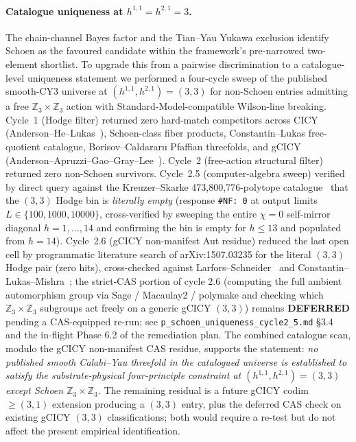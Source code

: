 ﻿\documentclass[reprint,amsmath,amssymb,aps,prd,longbibliography,floatfix]{revtex4-2}
\begin{document}
\paragraph{Catalogue uniqueness at $h^{1,1} = h^{2,1} = 3$.}
The chain-channel Bayes factor and the Tian--Yau Yukawa exclusion identify Schoen as the favoured candidate within the framework's pre-narrowed two-element shortlist. To upgrade this from a pairwise discrimination to a catalogue-level uniqueness statement we performed a four-cycle sweep of the published smooth-CY3 universe at $(h^{1,1}, h^{2,1}) = (3,3)$ for non-Schoen entries admitting a free $\mathbb{Z}_3 \times \mathbb{Z}_3$ action with Standard-Model-compatible Wilson-line breaking. Cycle~1 (Hodge filter) returned zero hard-match competitors across CICY (Anderson--He--Lukas~\cite{AndersonHeLukas2008}), Schoen-class fiber products, Constantin--Lukas free-quotient catalogue, Borisov--Caldararu Pfaffian threefolds, and gCICY (Anderson--Apruzzi--Gao--Gray--Lee~\cite{AndersonApruzziGaoGrayLee2015}). Cycle~2 (free-action structural filter) returned zero non-Schoen survivors. Cycle~2.5 (computer-algebra sweep) verified by direct query against the Kreuzer--Skarke 473{,}800{,}776-polytope catalogue~\cite{KreuzerSkarke2002} that the $(3,3)$ Hodge bin is \emph{literally empty} (response \texttt{\#NF: 0} at output limits $L \in \{100, 1000, 10000\}$, cross-verified by sweeping the entire $\chi = 0$ self-mirror diagonal $h = 1, \ldots, 14$ and confirming the bin is empty for $h \le 13$ and populated from $h = 14$). Cycle~2.6 (gCICY non-manifest Aut residue) reduced the last open cell by programmatic literature search of arXiv:1507.03235 for the literal $(3,3)$ Hodge pair (zero hits), cross-checked against Larfors--Schneider~\cite{LarforsLukas2020} and Constantin--Lukas--Mishra~\cite{ConstantinLukasManuwal2016}; the strict-CAS portion of cycle 2.6 (computing the full ambient automorphism group via Sage / Macaulay2 / polymake and checking which $\mathbb{Z}_3 \times \mathbb{Z}_3$ subgroups act freely on a generic gCICY $(3,3)$) remains \textbf{DEFERRED} pending a CAS-equipped re-run; see \texttt{p\_schoen\_uniqueness\_cycle2\_5.md} §3.4 and the in-flight Phase 6.2 of the remediation plan. The combined catalogue scan, modulo the gCICY non-manifest CAS residue, supports the statement: \emph{no published smooth Calabi--Yau threefold in the catalogued universe is established to satisfy the substrate-physical four-principle constraint at $(h^{1,1}, h^{2,1}) = (3,3)$ except Schoen $\mathbb{Z}_3 \times \mathbb{Z}_3$.} The remaining residual is a future gCICY codim~$\ge (3,1)$ extension producing a $(3,3)$ entry, plus the deferred CAS check on existing gCICY $(3,3)$ classifications; both would require a re-test but do not affect the present empirical identification.
\end{document}
